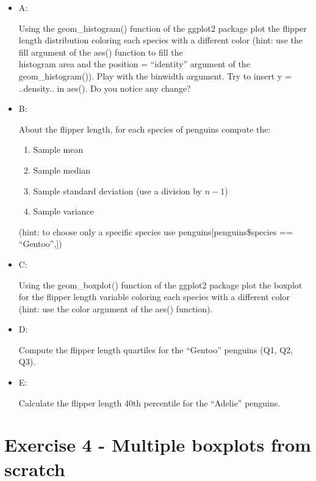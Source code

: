 \documentclass[
]{article}
\providecommand{\tightlist}{%
  \setlength{\itemsep}{0pt}\setlength{\parskip}{0pt}}
\begin{document}
\begin{itemize}
\item
  A:

  Using the geom\_histogram() function of the ggplot2 package plot the
  flipper length distribution coloring each species with a different
  color (hint: use the fill argument of the aes() function to fill the\\
  histogram area and the position = ``identity'' argument of the
  geom\_histogram()). Play with the binwidth argument. Try to insert y =
  ..density.. in aes(). Do you notice any change?
\item
  B:

  About the flipper length, for each species of penguins compute the:

  \begin{enumerate}
  \def\labelenumi{\arabic{enumi}.}
  \tightlist
  \item
    Sample mean
  \item
    Sample median
  \item
    Sample standard deviation (use a division by \(n-1\))
  \item
    Sample variance
  \end{enumerate}

  (hint: to choose only a specific species use
  penguins{[}penguins\$species == ``Gentoo'',{]})
\item
  C:

  Using the geom\_boxplot() function of the ggplot2 package plot the
  boxplot for the flipper length variable coloring each species with a
  different color (hint: use the color argument of the aes() function).
\item
  D:

  Compute the flipper length quartiles for the ``Gentoo'' penguins (Q1,
  Q2, Q3).
\item
  E:

  Calculate the flipper length 40th percentile for the ``Adelie''
  penguins.
\end{itemize}

\hypertarget{exercise-4---multiple-boxplots-from-scratch}{%
\section{Exercise 4 - Multiple boxplots from
scratch}\label{exercise-4---multiple-boxplots-from-scratch}}
\end{document}
